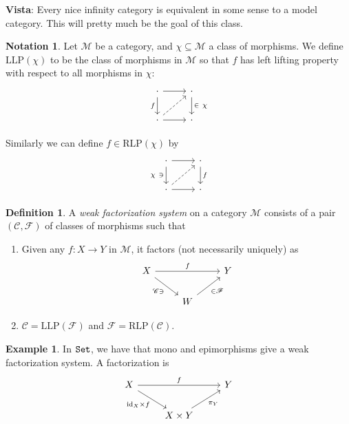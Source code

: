 \documentclass[12pt]{amsart}
\theoremstyle{definition}
\newtheorem{definition}[theorem]{Definition}
\newtheorem{example}[theorem]{Example}
\newtheorem{notation}[theorem]{Notation}
\providecommand{\LLP}{\text{LLP}}
\providecommand{\RLP}{\text{RLP}}
\begin{document}
\textbf{Vista}: Every nice infinity category is equivalent in some sense to a model category. This will pretty much be the goal of this class.

\begin{notation} Let $\mathcal{M}$ be a category, and $\chi \subseteq \mathcal{M}$ a class of morphisms. We define $\LLP(\chi)$ to be the class of morphisms in $\mathcal{M}$ so that $f$ has left lifting property with respect to all morphisms in $\chi$:
\[\begin{tikzcd}
    \cdot\rar\dar["f" left] & \cdot\dar["\in\ \chi" right]\\
    \cdot\rar\ar[ur,dashed] & \cdot
\end{tikzcd} \]
\end{notation}

Similarly we can define $f\in \RLP(\chi)$ by
\[\begin{tikzcd}
    \cdot\rar\dar["\chi\ \ni" left] & \cdot\dar["f" right]\\
    \cdot\rar\ar[ur,dashed] & \cdot
\end{tikzcd} \]

\begin{definition} A \textit{weak factorization system} on a category $\mathcal{M}$ consists of a pair $(\mathscr{C}, \mathscr{F})$ of classes of morphisms such that
\begin{enumerate}
    \item Given any $f: X \to Y$ in $\mathcal{M}$, it factors (not necessarily uniquely) as
\[ \begin{tikzcd}
    X\ar[rr,"f" above]\ar[dr,"\mathscr{C}\ni" below left] &  & Y\\
     & W\ar[ur,"\in \mathscr{F}" below right] &
\end{tikzcd} \]

    \item $\mathscr{C} = \LLP(\mathscr{F})$ and $\mathscr{F} = \RLP(\mathscr{C})$.
\end{enumerate}
\end{definition}

\begin{example} In $\texttt{Set}$, we have that mono and epimorphisms give a weak factorization system. A factorization is
\[ \begin{tikzcd}
    X\ar[rr,"f" above]\ar[dr,"\id_X \times f" below left] &  & Y\\
     & X \times Y\ar[ur,"\pi_Y" below right] & 
\end{tikzcd} \]
\end{example}
\end{document}
